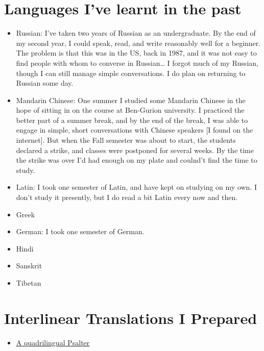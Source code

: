 \documentclass[11pt]{article}
\begin{document}
\section{Languages I've learnt in the past}
\label{sec:org37f02a0}
\begin{itemize}
\item Russian: I've taken two years of Russian as an undergraduate. By the end of my second year, I could speak, read, and write reasonably well for a beginner. The problem is that this was in the US, back in 1987, and it was not easy to find people with whom to converse in Russian\ldots{} I forgot much of my Russian, though I can still manage simple conversations. I do plan on returning to Russian some day.
\item Mandarin Chinese: One summer I studied some Mandarin Chinese in the hope of sitting in on the course at Ben-Gurion university. I practiced the better part of a summer break, and by the end of the break, I was able to engage in simple, short conversations with Chinese speakers [I found on the internet]. But when the Fall semester was about to start, the students declared a strike, and classes were postponed for several weeks. By the time the strike was over I'd had enough on my plate and coulnd't find the time to study.
\item Latin: I took one semester of Latin, and have kept on studying on my own. I don't study it presently, but I do read a bit Latin every now and then.
\item Greek
\item German: I took one semester of German.
\item Hindi
\item Sanskrit
\item Tibetan
\end{itemize}
\section{Interlinear Translations I Prepared}
\label{sec:org1095c82}
\begin{itemize}
\item \href{./psalter.html}{A quadrilingual Psalter}
\end{itemize}
\end{document}
